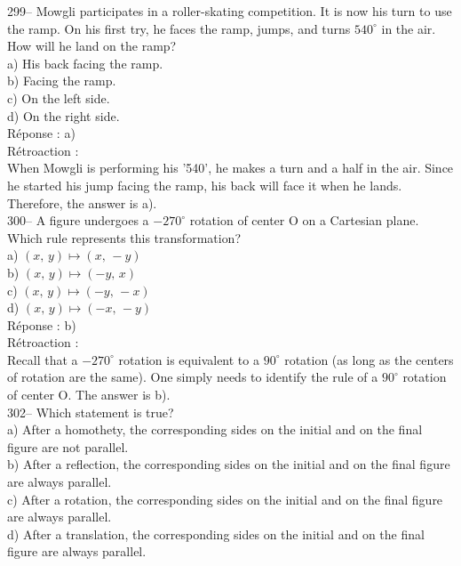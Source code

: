 \documentclass[letterpaper, 12pt]{article}
\begin{document}
299-- Mowgli participates in a roller-skating competition. It is now
his turn to use the ramp. On his first try, he faces the ramp,
jumps, and turns $540^{\circ}$ in the air. How will he land on the
ramp?\\

a) His back facing the ramp.\\
b) Facing the ramp.\\
c) On the left side.\\
d) On the right side.\\

R\'eponse : a)\\

R\'etroaction :\\
When Mowgli is performing his '540',  he makes a turn and a half in
the air. Since he started his jump facing the ramp, his back will
face it when he lands. Therefore, the answer is a).\\

300-- A figure undergoes a $-270^{\circ}$ rotation of center O on a Cartesian plane. Which rule represents this transformation?\\

a) $\left( x,\,y\right) \longmapsto \left(x,\,-y \right)$\\
b) $\left( x,\,y\right) \longmapsto \left(-y,\,x \right)$\\
c) $\left( x,\,y\right) \longmapsto \left(-y,\,-x \right)$\\
d) $\left( x,\,y\right) \longmapsto \left(-x,\,-y \right)$\\

R\'eponse : b)\\

R\'etroaction :\\
Recall that a $-270^{\circ}$ rotation is equivalent to a $90^{\circ}$ rotation (as long as the centers of rotation are the same). One simply needs to identify the rule of a $90^{\circ}$ rotation of center O. The answer is b).\\


302-- Which statement is true?\\

a) After a homothety, the corresponding sides on the initial and on the final figure are not parallel.\\
b) After a reflection, the corresponding sides on the initial and on the final figure are always parallel.\\
c) After a rotation, the corresponding sides on the initial and on the final figure are always parallel.\\
d) After a translation, the corresponding sides on the initial and on the final figure are always parallel.\\\\
\end{document}
